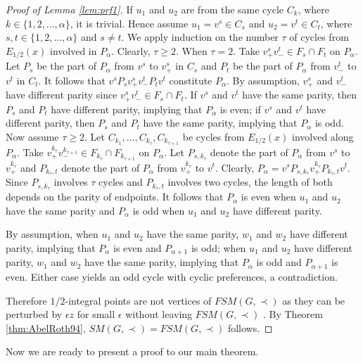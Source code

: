 \documentclass[11pt]{article}
\numberwithin{theorem}{section}
\begin{document}
\begin{proof}[Proof of Lemma \ref{lem:prf1}]
If $u_1$ and $u_2$ are from the same cycle $C_k$, where $k\in \{1,2,\ldots,\alpha\}$, it is trivial. Hence assume $u_1=v^s \in C_s$ and $u_2=v^t\in C_t$, where $s,t\in \{1,2,\ldots,\alpha\}$ and $s\not=t$. We apply induction on the number $\tau$ of cycles from $E_{1/2}(x)$ involved in $P_\alpha$. Clearly, $\tau\geq 2$.
When $\tau=2$. Take $v^s_+ v^t_-\in F_s\cap F_t$ on $P_\alpha$. Let $P_s$ be the part of $P_\alpha$ from $v^s$ to $v^s_+$ in $C_s$ and $P_t$ be the part of $P_\alpha$ from $v^t_-$ to $v^t$ in $C_t$. It follows that $v^sP_s v^s_+ v^t_- P_t v^t$ constitute $P_\alpha$. By assumption, $v^s_+$ and $v^t_-$ have different parity since $v^s_+ v^t_-\in F_s\cap F_t$. If $v^s$ and $v^t$ have the same parity, then $P_s$ and $P_t$ have different parity, implying that $P_\alpha$ is even; if $v^s$ and $v^t$ have different parity, then $P_s$ and $P_t$ have the same parity, implying that $P_\alpha$ is odd.
Now assume $\tau\geq 2$. Let $C_{k_1},\ldots,C_{k_\tau},C_{k_{\tau+1}}$ be cycles from $E_{1/2}(x)$ involved along $P_\alpha$. Take $v^{k_{\tau}}_+ v^{k_{\tau+1}}_- \in F_{k_{\tau}}\cap F_{k_{\tau+1}}$ on $P_\alpha$. Let $P_{s, k_{\tau}}$ denote the part of $P_\alpha$ from $v^s$ to $v^{k_{\tau}}_+$ and $P_{k_{\tau},t}$ denote the part of $P_\alpha$ from $v^{k_{\tau}}_+$ to $v^t$. Clearly, $P_\alpha=v^sP_{s,k_\tau} v^{k_\tau}_+ P_{k_\tau, t} v^t$. Since $P_{s, k_{\tau}}$ involves $\tau$ cycles and $P_{k_{\tau},t}$ involves two cycles, the length of both depends on the parity of endpoints. It follows that $P_\alpha$ is even when $u_1$ and $u_2$ have the same parity and $P_\alpha$ is odd when $u_1$ and $u_2$ have different parity.

By assumption, when $u_1$ and $u_2$ have the same parity, $w_1$ and $w_2$ have different parity, implying that $P_\alpha$ is even and $P_{\alpha+1}$ is odd;
when $u_1$ and $u_2$ have different parity, $w_1$ and $w_2$ have the same parity, implying that $P_\alpha$ is odd and $P_{\alpha+1}$ is even. 
Either case yields an odd cycle with cyclic preferences, a contradiction.

Therefore $1/2$-integral points are not vertices of $FSM(G,\prec)$ as they can be perturbed by $\epsilon z$ for small $\epsilon$ without leaving $FSM(G,\prec)$ . By Theorem \ref{thm:AbelRoth94}, $SM(G,\prec)=FSM(G,\prec)$ follows. 
\end{proof}

Now we are ready to present a proof to our main theorem.
\end{document}
